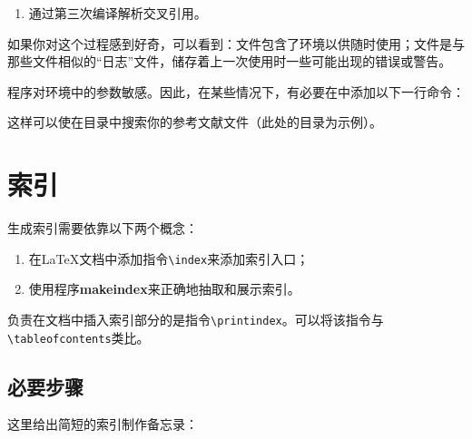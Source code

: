 \begin{enumerate}

    \item 通过第三次编译解析交叉引用。
\end{enumerate}

如果你对这个过程感到好奇，可以看到：文件包含了环境以供随时使用；文件是与那些文件相似的``日志''文件，储存着上一次使用\bib 时一些可能出现的错误或警告。

\begin{exclamation}
程序\bib 对环境中的参数敏感。因此，在某些情况下，有必要在\linebreak{}中添加以下一行命令：


这样可以使\bib 在目录中搜索你的参考文献文件（此处的目录为示例）。
\end{exclamation}

\section{索引}

生成索引需要依靠以下两个概念：

\begin{enumerate}
    \item 在\LaTeX 文档中添加指令\verb|\index|来添加索引入口；
    \item 使用程序\textbf{makeindex}来正确地抽取和展示索引。
\end{enumerate}

负责在文档中插入索引部分的是指令\verb|\printindex|。可以将该指令与\verb|\tableofcontents|类比。

\subsection{必要步骤}

这里给出简短的索引制作备忘录：

